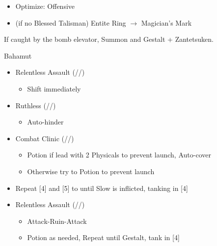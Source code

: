 \begin{multicols}{2}
\begin{menu}
\begin{itemize}
\begin{itemize}
        \begin{itemize}
                \item Optimize: Offensive
                \item (if no Blessed Talisman) Entite Ring $\rightarrow$ Magician's Mark
        \end{itemize}
    \end{itemize}
\end{itemize}
\end{menu}
If caught by the bomb elevator, Summon and Gestalt + Zantetsuken. 
\renewcommand{\first}{[1] Relentless Assault (\com/\rav/\rav)}
\renewcommand{\fifth}{[5] Ruthless (\sab/\com/\rav)
\renewcommand{\fourth}{[4] Combat Clinic (\sen/\med/\med)}}
\begin{battle}{Bahamut}
\begin{itemize}
    \item \first
    \begin{itemize}
        \item Shift immediately
    \end{itemize}
    \item \fifth
    \begin{itemize}
        \item Auto-hinder
    \end{itemize}
    \item \fourth
    \begin{itemize}
        \item Potion if lead with 2 Physicals to prevent launch, Auto-cover
        \item Otherwise try to Potion to prevent launch
    \end{itemize}
    \item Repeat [4] and [5] to until Slow is inflicted, tanking in [4]
    \item \first
    \begin{itemize}
        \item Attack-Ruin-Attack
        \item Potion as needed, Repeat until Gestalt, tank in [4]
    \end{itemize}
\end{itemize}
\end{battle}
\end{multicols}
